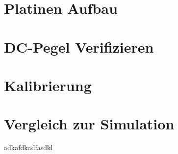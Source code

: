 
\section{Platinen Aufbau}
\section{DC-Pegel Verifizieren}
\section{Kalibrierung}
\section{Vergleich zur Simulation}
\clearpage
adkafdkadfasdkl